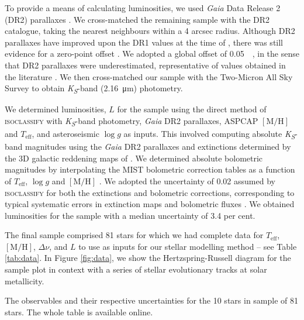\documentclass[a4paper,fleqn,usenatbib]{mnras}
\newcommand{\dnu}{\ensuremath{\Delta\nu}}
\newcommand{\metallicity}{\ensuremath{[\mathrm{M}/\mathrm{H}]}}
\newcommand{\teff}{\ensuremath{T_\mathrm{eff}}}
\begin{document}
To provide a means of calculating luminosities, we used \emph{Gaia} Data Release 2 (DR2) parallaxes \citep{GaiaCollaboration.Prusti.ea2016, GaiaCollaboration.Brown.ea2018}. We cross-matched the remaining sample with the DR2 catalogue, taking the nearest neighbours within a 4 arcsec radius. Although DR2 parallaxes have improved upon the DR1 values at the time of , there was still evidence for a zero-point offset \citep{Lindegren.Hernandez.ea2018}. We adopted a global offset of \SI{0.05}{\milli\aarcsec}, in the sense that DR2 parallaxes were underestimated, representative of values obtained in the literature \citep[see e.g.][]{Riess.Casertano.ea2018, Zinn.Pinsonneault.ea2019, Hall.Davies.ea2019, Chan.Bovy2020}. We then cross-matched our sample with the Two-Micron All Sky Survey \citep[2MASS;][]{Skrutskie.Cutri.ea2006} to obtain \emph{K\textsubscript{S}}-band (\SI{2.16}{\micro\metre}) photometry.

We determined luminosities, $L$ for the sample using the direct method of \textsc{isoclassify} \citep{Huber.Zinn.ea2017, Berger.Huber.ea2020} with \emph{K\textsubscript{S}}-band photometry, \emph{Gaia} DR2 parallaxes, ASPCAP $\metallicity$ and $\teff$, and asteroseismic $\log g$ as inputs. This involved computing absolute \emph{K\textsubscript{S}}-band magnitudes using the \emph{Gaia} DR2 parallaxes and extinctions determined by the 3D galactic reddening maps of \citet{Green.Schlafly.ea2018}. We determined absolute bolometric magnitudes by interpolating the MIST bolometric correction tables as a function of $\teff$, $\log g$ and $\metallicity$ \citep{Dotter2016, Choi.Dotter.ea2016}. We adopted the uncertainty of \SI{0.02}{\magnitude} assumed by \textsc{isoclassify} for both the extinctions and bolometric corrections, corresponding to typical systematic errors in extinction maps and bolometric fluxes \citep[e.g.][]{Zinn.Pinsonneault.ea2019a,Tayar.Claytor.ea2020}. We obtained luminosities for the sample with a median uncertainty of 3.4 per cent.

The final sample comprised 81 stars for which we had complete data for $\teff$, $\metallicity$, $\dnu$, and $L$ to use as inputs for our stellar modelling method -- see Table \ref{tab:data}. In Figure \ref{fig:data}, we show the Hertzspring-Russell diagram for the sample plot in context with a series of stellar evolutionary tracks at solar metallicity.

\begin{table}
	\centering
	\caption{The observables and their respective uncertainties for the 10 stars in sample of 81 stars. The whole table is available online.}
	\label{tab:data}
	
\end{table}
\end{document}
